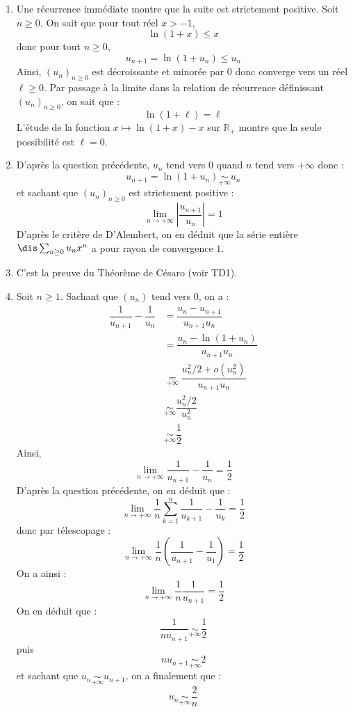 \documentclass[a4paper,10pt]{report}
\begin{document}
\begin{corr} 
\begin{enumerate}
\item Une récurrence immédiate montre que la suite est strictement positive. Soit $n \geq 0$. On sait que pour tout réel $x>-1$,
$$ \ln(1+x) \leq x$$
donc pour tout $n \geq 0$,
$$ u_{n+1} = \ln(1+u_n) \leq u_n$$
Ainsi, $(u_n)_{n \geq 0}$ est décroissante et minorée par $0$ donc converge vers un réel $\ell \geq 0$. Par passage à la limite dans la relation de récurrence définissant $(u_n)_{n \geq 0}$, on sait que :
$$ \ln(1+ \ell) = \ell$$
L'étude de la fonction $x \mapsto \ln(1+x) - x$ sur $\mathbb{R}_+$ montre que la seule possibilité est $\ell=0$.
\item D'après la question précédente, $u_n$ tend vers $0$ quand $n$ tend vers $+ \infty$ donc :
$$ u_{n+1} = \ln(1+u_n) \underset{+ \infty}{\sim} u_n $$
et sachant que $(u_n)_{n \geq 0}$ est strictement positive :
$$ \lim_{n \rightarrow + \infty} \left\vert \dfrac{u_{n+1}}{u_n} \right\vert = 1$$
D'après le critère de D'Alembert, on en déduit que la série entière $\dis \sum_{n \geq 0} u_n x^n$ a pour rayon de convergence $1$.
\item C'est la preuve du Théorème de Césaro (voir TD1).
\item Soit $n \geq 1$. Sachant que $(u_n)$ tend vers $0$, on a :
\begin{align*}
\dfrac{1}{u_{n+1}} - \dfrac{1}{u_n} & = \dfrac{u_n-u_{n+1}}{u_{n+1}u_n} \\
& = \dfrac{u_n-\ln(1+u_n)}{u_{n+1}u_n} \\
& \underset{+ \infty}{=} \dfrac{u_n^2/2 + o(u_n^2)}{u_{n+1}u_n} \\
& \underset{+ \infty}{\sim} \dfrac{u_n^2/2}{u_n^2} \\
& \underset{+ \infty}{\sim} \dfrac{1}{2}
\end{align*}
Ainsi,
$$ \lim_{n \rightarrow + \infty} \dfrac{1}{u_{n+1}} - \dfrac{1}{u_n}  = \dfrac{1}{2}$$
D'après la question précédente, on en déduit que :
$$ \lim_{n \rightarrow + \infty} \dfrac{1}{n} \sum_{k=1}^n  \dfrac{1}{u_{k+1}} - \dfrac{1}{u_k} = \dfrac{1}{2}$$
donc par télescopage :
$$ \lim_{n \rightarrow + \infty} \dfrac{1}{n} \left(  \dfrac{1}{u_{n+1}} - \dfrac{1}{u_1} \right) = \dfrac{1}{2}$$
On a ainsi :
$$  \lim_{n \rightarrow + \infty} \dfrac{1}{n}   \dfrac{1}{u_{n+1}}  = \dfrac{1}{2}$$
On en déduit que :
$$ \dfrac{1}{n u_{n+1}} \underset{+ \infty}{\sim} \dfrac{1}{2}$$
puis 
$$ n u_{n+1} \underset{+ \infty}{\sim} 2$$
et sachant que $u_n \underset{+ \infty}{\sim} u_{n+1}$, on a finalement que :
$$ u_n \underset{+ \infty}{\sim} \dfrac{2}{n}$$
\end{enumerate}
\end{corr}
\end{document}
